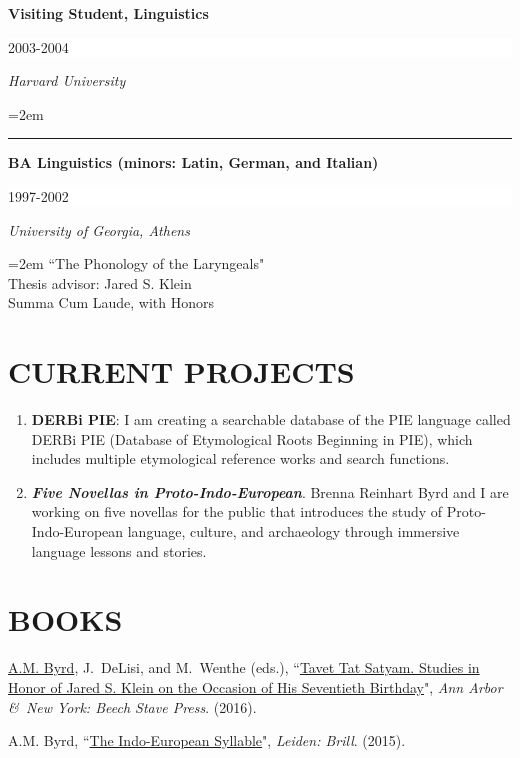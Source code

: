 \documentclass[paper=letter,fontsize=11pt]{scrartcl} %
\newcommand{\sepspace}{\vspace*{1em}}		%
\newcommand{\NewPart}[2]{\section*{\uppercase{#1} #2}}
\newcommand{\EducationEntry}[4]{
		\noindent \textbf{#1} \hfill      %
		\colorbox{White}{%
			\parbox{6em}{%
			\hfill\color{Black}#2}} \par  %
		\noindent \textit{#3} \par        %
		\noindent\hangindent=2em\hangafter=0 \small #4 %
		\normalsize \par}
\newcommand{\BookEntry}[4]{
		\noindent #1, ``\href{#3}{#4}", \textit{#3}.}
\begin{document}
\EducationEntry{Visiting Student, Linguistics}{2003-2004}{Harvard University}

\noindent\rule{8cm}{0.2pt}

\EducationEntry{BA Linguistics (minors: Latin, German, and Italian)}{1997-2002}{University of Georgia, Athens}
{``The Phonology of the Laryngeals"\\
Thesis advisor: Jared S. Klein\\
Summa Cum Laude, with Honors}

\NewPart{Current Projects}{}
\begin{enumerate}
\item{{\textbf{DERBi PIE}}: I am creating a searchable database of the PIE language called DERBi PIE (Database of Etymological Roots Beginning in PIE), which includes multiple etymological reference works and search functions.}
\item{{\textit{\textbf{Five Novellas in Proto-Indo-European}}}}. Brenna Reinhart Byrd and I are working on five novellas for the public that introduces the study of Proto-Indo-European language, culture, and archaeology through immersive language lessons and stories.

\end{enumerate}




\NewPart{Books}{}
\begin{etaremune}
\item \BookEntry{\underline{A.M. Byrd}, J.~DeLisi, and M.~Wenthe (eds.)}{http://www.beechstave.com/tavet.htm}
{Ann Arbor \&~New York: Beech Stave Press} {Tavet Tat Satyam. Studies in Honor of Jared S. Klein on the Occasion of His Seventieth Birthday}{ (2016).}
\item \BookEntry{A.M. Byrd}{http://www.beechstave.com/tavet.htm}{Leiden: Brill}{The Indo-European Syllable}{ (2015).}
\end{etaremune}
\end{document}
